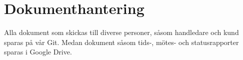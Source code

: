 \section{Dokumenthantering}
Alla dokument som skickas till diverse personer, såsom handledare och kund sparas på vår Git. Medan dokument såsom tids-, mötes- och statusrapporter sparas i Google Drive.
